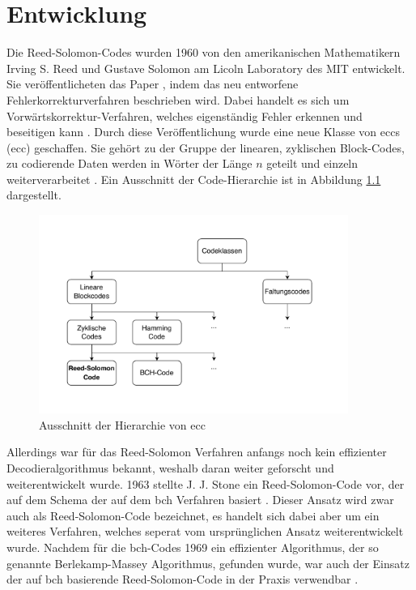 \chapter{Entwicklung}\label{ch:development}

Die Reed-Solomon-Codes wurden 1960 von den amerikanischen Mathematikern Irving S. Reed und Gustave Solomon am Licoln Laboratory des MIT entwickelt.
Sie veröffentlicheten das Paper , indem das neu entworfene Fehlerkorrekturverfahren beschrieben wird.
Dabei handelt es sich um Vorwärtskorrektur-Verfahren, welches eigenständig Fehler erkennen und beseitigen kann \cite{wickerReedSolomonCodes1994}.
Durch diese Veröffentlichung wurde eine neue Klasse von \acrlong{ecc}s (\acrshort{ecc}) geschaffen. 
Sie gehört zu der Gruppe der linearen, zyklischen Block-Codes, \dahe zu codierende Daten werden in Wörter der Länge \(n\) geteilt und einzeln weiterverarbeitet \cite{friedrichsKanalcodierung1996}. Ein Ausschnitt der Code-Hierarchie ist in Abbildung \ref{fig:eccHierarchy} dargestellt.

\begin{figure}[h]
	\centering
	\includegraphics[width=0.9\textwidth]{figures/Codeklassen.drawio.pdf}
	\caption{Ausschnitt der Hierarchie von \acrshort{ecc}}
	\label{fig:eccHierarchy}
\end{figure}

Allerdings war für das Reed-Solomon Verfahren anfangs noch kein effizienter Decodieralgorithmus bekannt, weshalb daran weiter geforscht und weiterentwickelt wurde.
1963 stellte J. J. Stone ein Reed-Solomon-Code vor, der auf dem Schema der auf dem \acrfull{bch} Verfahren basiert \cite{petersonErrorcorrectingCodes1972}.
Dieser Ansatz wird zwar auch als Reed-Solomon-Code bezeichnet, es handelt sich dabei aber um ein weiteres Verfahren, welches seperat vom ursprünglichen Ansatz weiterentwickelt wurde.
Nachdem für die \acrshort{bch}-Codes 1969 ein effizienter Algorithmus, der so genannte Berlekamp-Massey Algorithmus, gefunden wurde, war auch der Einsatz der auf \acrshort{bch} basierende Reed-Solomon-Code in der Praxis verwendbar \cite{berlekampNonbinaryBCHDecoding1968, masseyShiftregisterSynthesisBCH1969}.

